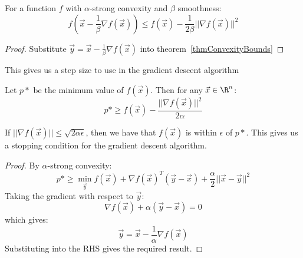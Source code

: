 \documentclass[../Main.tex]{subfiles}
\begin{document}
\begin{corollary}
    For a function $f$ with $\alpha$-strong convexity and $\beta$ smoothness:
    \begin{equation}
        f\left(\vec{x} - \frac{1}{\beta} \nabla f(\vec{x})\right) \leq f(\vec{x}) - \frac{1}{2\beta} ||\nabla f(\vec{x})||^2
        \label{eqnStepSizeBound}
    \end{equation}
    \label{corStepSizeBound}
\end{corollary}
\begin{proof}
    Substitute $\vec{y} = \vec{x} - \frac{1}{\beta} \nabla f(\vec{x})$ into theorem~\ref{thmConvexityBounds}
\end{proof}
\begin{remark}
    This gives us a step size to use in the gradient descent algorithm
\end{remark}
\begin{corollary}
    Let $p*$ be the minimum value of $f(\vec{x})$. Then for any $\vec{x} \in \R^n$:
    \begin{equation}
        p* \geq f(\vec{x}) - \frac{||\nabla f(\vec{x})||^2}{2\alpha}
        \label{eqnStopCriterionBound}
    \end{equation}
    \label{corStopCriterionBound}
\end{corollary}
\begin{remark}
    If $||\nabla f(\vec{x})|| \leq \sqrt{2\alpha \epsilon}$, then we have that $f(\vec{x})$ is within $\epsilon$ of $p*$. This gives us a stopping condition for the gradient descent algorithm.
\end{remark}
\begin{proof}
    By $\alpha$-strong convexity:
    \begin{equation*}
        p* \geq \min_{\vec{y}} f(\vec{x}) + \nabla f(\vec{x})^T (\vec{y} - \vec{x}) + \frac{\alpha}{2} ||\vec{x} - \vec{y}||^2
    \end{equation*}
    Taking the gradient with respect to $\vec{y}$:
    \begin{equation*}
        \nabla f(\vec{x}) + \alpha (\vec{y} - \vec{x}) = 0
    \end{equation*}
    which gives:
    \begin{equation*}
        \vec{y} = \vec{x} - \frac{1}{\alpha} \nabla f(\vec{x})
    \end{equation*}
    Substituting into the RHS gives the required result.
\end{proof}
\end{document}
